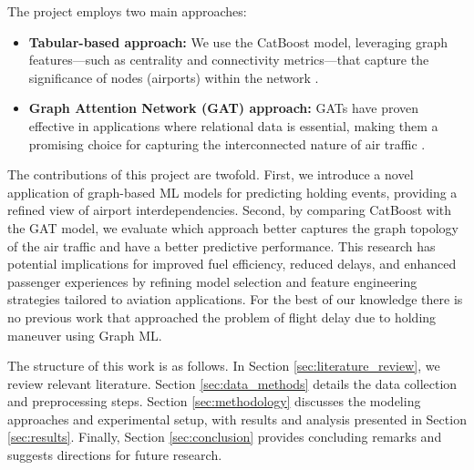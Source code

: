 The project employs two main approaches:

\begin{itemize}
    \item \textbf{Tabular-based approach:} We use the CatBoost model, leveraging graph features—such as centrality and connectivity metrics—that capture the significance of nodes (airports) within the network \cite{prokhorenkova2018catboost}.
    \item \textbf{Graph Attention Network (GAT) approach:} GATs have proven effective in applications where relational data is essential, making them a promising choice for capturing the interconnected nature of air traffic \cite{velickovic2017graph}.
\end{itemize}

The contributions of this project are twofold. First, we introduce a novel application of graph-based ML models for predicting holding events, providing a refined view of airport interdependencies. Second, by comparing CatBoost with the GAT model, we evaluate which approach better captures the graph topology of the air traffic and have a better predictive performance. This research has potential implications for improved fuel efficiency, reduced delays, and enhanced passenger experiences by refining model selection and feature engineering strategies tailored to aviation applications. For the best of our knowledge there is no previous work that approached the problem of flight delay due to holding maneuver using Graph ML.

The structure of this work is as follows. In Section \ref{sec:literature_review}, we review relevant literature. Section \ref{sec:data_methods} details the data collection and preprocessing steps. Section \ref{sec:methodology} discusses the modeling approaches and experimental setup, with results and analysis presented in Section \ref{sec:results}. Finally, Section \ref{sec:conclusion} provides concluding remarks and suggests directions for future research.
